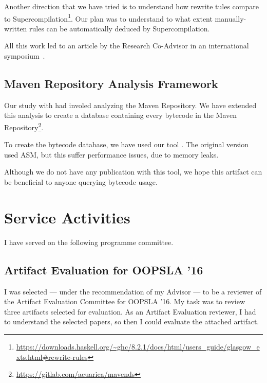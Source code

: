 Another direction that we have tried is to understand how rewrite tules compare to Supercompilation\footnote{\url{https://downloads.haskell.org/~ghc/8.2.1/docs/html/users_guide/glasgow_exts.html\#rewrite-rules}}.
Our plan was to understand to what extent manually-written rules can be automatically deduced by Supercompilation.

All this work led to an article by the Research Co-Advisor in an international symposium~\cite{Nystrom:2017:SFS:3136000.3136011}.

\subsection*{Maven Repository Analysis Framework}

Our study with \smu{} had involed analyzing the Maven Repository.
We have extended this analysis to create a database containing every bytecode in the Maven Repository\footnote{\url{https://gitlab.com/acuarica/mavends}}.

To create the bytecode database, we have used our tool \jnif{}.
The original version used ASM, but this suffer performance issues, due to memory leaks. 

Although we do not have any publication with this tool, we hope this artifact can be beneficial to anyone querying bytecode usage.

\section{Service Activities} \label{sec:service}

I have served on the following programme committee.

\subsection*{Artifact Evaluation for OOPSLA '16}

I was selected --- under the recommendation of my Advisor --- to be a reviewer of the Artifact Evaluation Committee for OOPSLA '16.
My task was to review three artifacts selected for evaluation.
As an Artifact Evaluation reviewer, I had to understand the selected papers, so
then I could evaluate the attached artifact.

